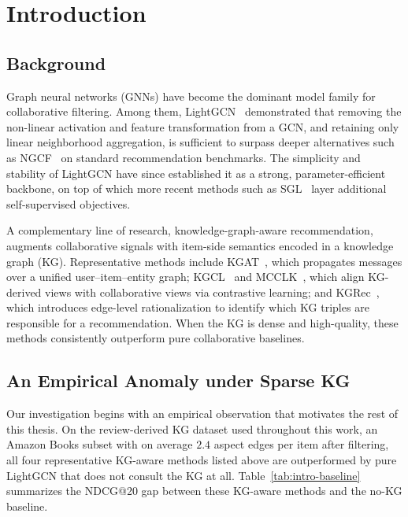 \chapter{Introduction}
\label{ch:intro}

\section{Background}
\label{sec:intro-background}

Graph neural networks (GNNs) have become the dominant model family for collaborative filtering. Among them, LightGCN~\cite{he2020lightgcn} demonstrated that removing the non-linear activation and feature transformation from a GCN, and retaining only linear neighborhood aggregation, is sufficient to surpass deeper alternatives such as NGCF~\cite{wang2019ngcf} on standard recommendation benchmarks. The simplicity and stability of LightGCN have since established it as a strong, parameter-efficient backbone, on top of which more recent methods such as SGL~\cite{wu2021sgl} layer additional self-supervised objectives.

A complementary line of research, knowledge-graph-aware recommendation, augments collaborative signals with item-side semantics encoded in a knowledge graph (KG). Representative methods include KGAT~\cite{wang2019kgat}, which propagates messages over a unified user--item--entity graph; KGCL~\cite{yang2022kgcl} and MCCLK~\cite{zou2022mcclk}, which align KG-derived views with collaborative views via contrastive learning; and KGRec~\cite{yang2023kgrec}, which introduces edge-level rationalization to identify which KG triples are responsible for a recommendation. When the KG is dense and high-quality, these methods consistently outperform pure collaborative baselines.

\section{An Empirical Anomaly under Sparse KG}
\label{sec:intro-observation}

Our investigation begins with an empirical observation that motivates the rest of this thesis. On the review-derived KG dataset used throughout this work, an Amazon Books subset with on average $2.4$ aspect edges per item after filtering, all four representative KG-aware methods listed above are outperformed by pure LightGCN that does not consult the KG at all. Table~\ref{tab:intro-baseline} summarizes the NDCG@20 gap between these KG-aware methods and the no-KG baseline.

